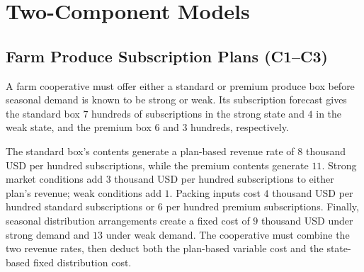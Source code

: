 
	\section{Two-Component Models}
	\label{sec:two-component-models}


	\subsection{Farm Produce Subscription Plans (C1--C3)}
	\label{sec:problem9-farm-produce-subscription-c1-c3}

	A farm cooperative must offer either a standard or premium produce box before seasonal demand is known to be strong or weak. Its subscription forecast gives the standard box \(7\) hundreds of subscriptions in the strong state and \(4\) in the weak state, and the premium box \(6\) and \(3\) hundreds, respectively.

	The standard box's contents generate a plan-based revenue rate of \(8\) thousand USD per hundred subscriptions, while the premium contents generate \(11\). Strong market conditions add \(3\) thousand USD per hundred subscriptions to either plan's revenue; weak conditions add \(1\). Packing inputs cost \(4\) thousand USD per hundred standard subscriptions or \(6\) per hundred premium subscriptions. Finally, seasonal distribution arrangements create a fixed cost of \(9\) thousand USD under strong demand and \(13\) under weak demand. The cooperative must combine the two revenue rates, then deduct both the plan-based variable cost and the state-based fixed distribution cost.

